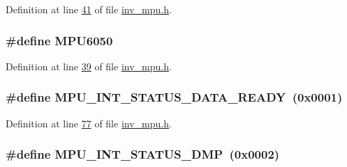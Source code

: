 Definition at line \hyperlink{inv__mpu_8h_source_l00041}{41} of file \hyperlink{inv__mpu_8h_source}{inv\+\_\+mpu.\+h}.

\subsubsection[{\texorpdfstring{M\+P\+U6050}{MPU6050}}]{\setlength{\rightskip}{0pt plus 5cm}\#define M\+P\+U6050}\hypertarget{group___d_r_i_v_e_r_s_ga6d132f914f18cb144a0eaf36312045c8}{}\label{group___d_r_i_v_e_r_s_ga6d132f914f18cb144a0eaf36312045c8}


Definition at line \hyperlink{inv__mpu_8h_source_l00039}{39} of file \hyperlink{inv__mpu_8h_source}{inv\+\_\+mpu.\+h}.

\subsubsection[{\texorpdfstring{M\+P\+U\+\_\+\+I\+N\+T\+\_\+\+S\+T\+A\+T\+U\+S\+\_\+\+D\+A\+T\+A\+\_\+\+R\+E\+A\+DY}{MPU_INT_STATUS_DATA_READY}}]{\setlength{\rightskip}{0pt plus 5cm}\#define M\+P\+U\+\_\+\+I\+N\+T\+\_\+\+S\+T\+A\+T\+U\+S\+\_\+\+D\+A\+T\+A\+\_\+\+R\+E\+A\+DY~(0x0001)}\hypertarget{group___d_r_i_v_e_r_s_ga0cddf0dffaf3bf65fd3ed92dda4f3193}{}\label{group___d_r_i_v_e_r_s_ga0cddf0dffaf3bf65fd3ed92dda4f3193}


Definition at line \hyperlink{inv__mpu_8h_source_l00077}{77} of file \hyperlink{inv__mpu_8h_source}{inv\+\_\+mpu.\+h}.

\subsubsection[{\texorpdfstring{M\+P\+U\+\_\+\+I\+N\+T\+\_\+\+S\+T\+A\+T\+U\+S\+\_\+\+D\+MP}{MPU_INT_STATUS_DMP}}]{\setlength{\rightskip}{0pt plus 5cm}\#define M\+P\+U\+\_\+\+I\+N\+T\+\_\+\+S\+T\+A\+T\+U\+S\+\_\+\+D\+MP~(0x0002)}\hypertarget{group___d_r_i_v_e_r_s_ga380dd1ef256931e99302c371ad7752f4}{}\label{group___d_r_i_v_e_r_s_ga380dd1ef256931e99302c371ad7752f4}


